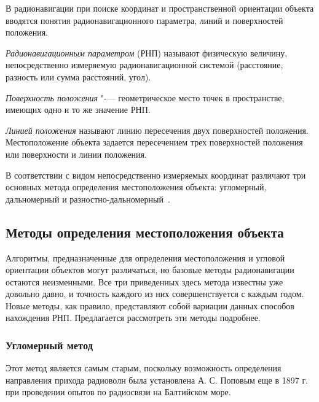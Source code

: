 \documentclass[../main.tex]{subfiles}
\begin{document}
\renewcommand{\figurename}{Рисунок}
В радионавигации при поиске координат и пространственной ориентации объекта вводятся понятия радионавигационного параметра, линий и поверхностей положения.

\textit{Радионавигационным параметром} (РНП) называют физическую величину, непосредственно измеряемую радионавигационной системой (расстояние, разность или сумма расстояний, угол).

\textit{Поверхность положения} "-— геометрическое место точек в пространстве, имеющих одно и то же значение РНП.

\textit{Линией положения} называют линию пересечения двух поверхностей положения. Местоположение объекта задается пересечением трех поверхностей положения или поверхности и линии положения.

В соответствии с видом непосредственно измеряемых координат различают три основных метода определения местоположения объекта: угломерный, дальномерный и разностно-дальномерный~\cite{KAZARINOV:2008}.

\subsection{Методы определения местоположения объекта}
Алгоритмы, предназначенные для определения местоположения и угловой ориентации объектов могут различаться, но базовые методы радионавигации остаются неизменными. Все три приведенных здесь метода известны уже довольно давно, и точность каждого из них совершенствуется с каждым годом. Новые методы, как правило, представляют собой вариации данных способов нахождения РНП. Предлагается рассмотреть эти методы подробнее.

\subsubsection{Угломерный метод}
Этот метод является самым старым, поскольку возможность определения направления прихода радиоволн была установлена А. С. Поповым еще в 1897 г. при проведении опытов по радиосвязи на Балтийском море.
\end{document}
